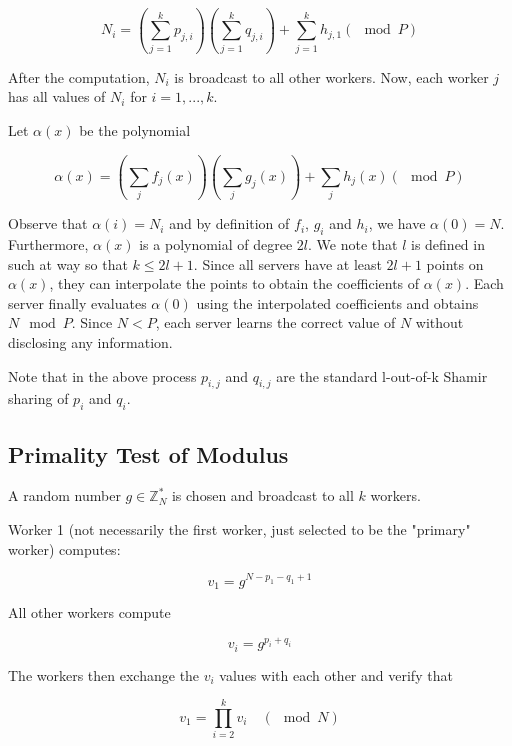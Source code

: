 \begin{equation}
    N_i = \left( \sum_{j=1}^{k} p_{j, i}\right)\left( \sum_{j=1}^{k} q_{j, i}\right) + \sum_{j=1}^{k} h_{j,1} (\mod P)
\end{equation}

After the computation, $N_i$ is broadcast to all other workers. Now, each worker $j$ has all values of $N_i$ for $i = 1,..., k$.

Let $\alpha(x)$ be the polynomial

\begin{equation}
  \alpha(x) = \left( \sum_j f_j(x)\right) \left( \sum_j g_j(x)\right) + \sum_j h_j(x) (\mod P)
\end{equation}

Observe that $\alpha(i) = N_i$ and by definition of $f_i$, $g_i$ and $h_i$, we have $\alpha(0) = N$. Furthermore, $\alpha(x)$ is a polynomial of degree $2l$. We note that $l$ is defined in such at way so that $k \leq 2l + 1$. Since all servers have at least $2l + 1$ points on $\alpha(x)$, they can interpolate the points to obtain the coefficients of $\alpha(x)$. Each server finally evaluates $\alpha(0)$ using the interpolated coefficients and obtains $N \mod P$. Since $N < P$, each server learns the correct value of $N$ without disclosing any information.

Note that in the above process $p_{i,j}$ and $q_{i,j}$ are the standard l-out-of-k Shamir sharing of $p_i$ and $q_i$.

\subsection{Primality Test of Modulus}

A random number $g \in \mathbb{Z}_N^*$ is chosen and broadcast to all $k$ workers.

Worker 1 (not necessarily the first worker, just selected to be the "primary" worker) computes:

\begin{equation}
  v_1 = g^{N - p_1 - q_1 + 1}
\end{equation}

All other workers compute

\begin{equation}
  v_i = g^{p_i + q_i}
\end{equation}

The workers then exchange the $v_i$ values with each other and verify that

\begin{equation}
  v_1 = \prod_{i=2}^{k} v_i \quad (\mod N)
\end{equation}

